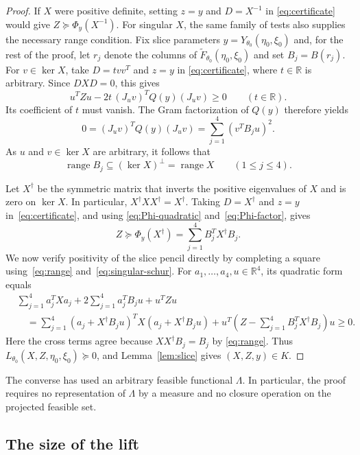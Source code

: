 \begin{proof}
If $X$ were positive definite, setting $z=y$ and $D=X^{-1}$ in
\eqref{eq:certificate} would give $Z\succeq\Phi_y(X^{-1})$.
For singular $X$, the same family of tests also supplies the necessary
range condition.  Fix slice parameters
$y=Y_{\theta_0}(\eta_0,\xi_0)$ and, for the rest of the proof, let
$r_j$ denote the columns of
$\widetilde F_{\theta_0}(\eta_0,\xi_0)$ and set $B_j=B(r_j)$.
For $v\in\ker X$, take $D=t vv^T$ and $z=y$ in
\eqref{eq:certificate}, where $t\in\mathbb R$ is arbitrary.  Since
$DXD=0$, this gives
\[
  u^TZu-2t\,(J_uv)^TQ(y)(J_uv)\geq0
  \qquad(t\in\mathbb R).
\]
Its coefficient of $t$ must vanish.  The Gram factorization of $Q(y)$
therefore yields
\[
  0=(J_uv)^TQ(y)(J_uv)
    =\sum_{j=1}^4(v^TB_ju)^2.
\]
As $u$ and $v\in\ker X$ are arbitrary, it follows that
\begin{equation}\label{eq:range}
  \operatorname{range}B_j\subseteq(\ker X)^\perp
    =\operatorname{range}X\qquad(1\leq j\leq4).
\end{equation}

Let $X^\dagger$ be the symmetric matrix that inverts the positive
eigenvalues of $X$ and is zero on $\ker X$.  In particular,
$X^\dagger XX^\dagger=X^\dagger$.
Taking $D=X^\dagger$ and $z=y$ in~\eqref{eq:certificate}, and using
\eqref{eq:Phi-quadratic} and~\eqref{eq:Phi-factor}, gives
\begin{equation}\label{eq:singular-schur}
  Z\succeq\Phi_y(X^\dagger)
    =\sum_{j=1}^4B_j^TX^\dagger B_j.
\end{equation}
We now verify positivity of the slice pencil directly by completing
a square using~\eqref{eq:range} and~\eqref{eq:singular-schur}.  For
$a_1,\ldots,a_4,u\in\mathbb R^4$, its quadratic form equals
\begin{align*}
  &\sum_{j=1}^4a_j^TXa_j
    +2\sum_{j=1}^4a_j^TB_ju+u^TZu\\
  &\quad=\sum_{j=1}^4
    (a_j+X^\dagger B_ju)^TX(a_j+X^\dagger B_ju)
    +u^T\left(Z-\sum_{j=1}^4B_j^TX^\dagger B_j\right)u
    \geq0.
\end{align*}
Here the cross terms agree because $XX^\dagger B_j=B_j$ by
\eqref{eq:range}.  Thus
$L_{\theta_0}(X,Z,\eta_0,\xi_0)\succeq0$, and
Lemma~\ref{lem:slice} gives $(X,Z,y)\in K$.
\end{proof}

The converse has used an arbitrary feasible functional $\Lambda$.
In particular, the proof requires no representation of $\Lambda$ by a
measure and no closure operation on the projected feasible set.

\subsection{The size of the lift}

